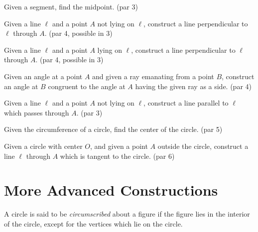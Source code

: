 \begin{challenge}\label{chal:midpoint}
Given a segment, find the midpoint. (par 3)
\end{challenge}

\begin{challenge}\label{chal:perp-pt-not-on-line}
Given a line $\ell$ and a point $A$ not lying on $\ell$, construct a line perpendicular to $\ell$ through $A$. (par 4, possible in 3)
\end{challenge}

\begin{challenge}\label{chal:perp-pt-on-line}
Given a line $\ell$ and a point $A$ lying on $\ell$, construct a line perpendicular to $\ell$ through $A$. (par 4, possible in 3)
\end{challenge}

\begin{challenge}\label{chal:copy-angle}
Given an angle at a point $A$ and given a ray emanating from a point $B$, construct an angle at $B$ congruent to the angle at $A$ having the given ray as a side. (par 4)
\end{challenge}

\begin{challenge}\label{chal:parallel}
Given a line $\ell$ and a point $A$ not lying on $\ell$, construct a line parallel to $\ell$ which passes through $A$. (par 3)
\end{challenge}

\begin{challenge}\label{chal:circle-center}
Given the circumference of a circle, find the center of the circle. (par 5)
\end{challenge}

\begin{challenge}\label{chal:tangent-circle-point}
Given a circle with center $O$, and given a point $A$ outside the circle, construct a line $\ell$ through $A$ which is tangent to the circle. (par 6)
\end{challenge}



\chapter{More Advanced Constructions}

\begin{definition}\label{defn:circumscribed}
A circle is said to be \emph{circumscribed} about a figure if the figure lies in the interior of the circle, except for the vertices which lie on the circle.
\end{definition}

